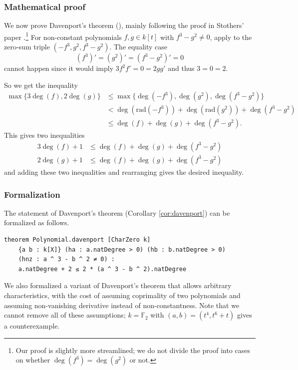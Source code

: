 \documentclass[runningheads]{llncs}
\newcommand{\rad}{\mathrm{rad}}
\begin{document}
\subsubsection{Mathematical proof}

We now prove Davenport's theorem (), mainly following the proof in Stothers' paper \cite{stothers81}.\footnote{Our proof is slightly more streamlined; we do not divide the proof into cases on whether $\deg(f^3) = \deg(g^2)$ or not.} For non-constant polynomials $f, g \in k[t]$ with $f^3 - g^2 \ne 0$, apply  to the zero-sum triple $(-f^3, g^2, f^3 - g^2)$.
The equality case
$$(f^3)' = (g^2)' = (f^3 - g^2)' = 0$$ cannot happen since it would imply $3f^2f' = 0 = 2gg'$ and thus $3 = 0 = 2$.

So we get the inequality
\begin{align*}
    \max \{3 \deg (f), 2 \deg (g) \} & \leq \max \{ \deg(-f^3), \deg(g^2), \deg(f^3 - g^2) \} \\
    &< \deg(\rad(-f^3)) +  \deg(\rad(g^2)) + \deg(f^3 - g^2) \\
    &\le \deg (f) + \deg(g) + \deg(f^3 - g^2).
\end{align*}
This gives two inequalities
\begin{align*}
    3 \deg(f) + 1 & \leq \deg(f) + \deg(g) + \deg(f^3 - g^2) \\
    2 \deg(g) + 1 & \leq \deg(f) + \deg(g) + \deg(f^3 - g^2)
\end{align*}
and adding these two inequalities and rearranging gives the desired inequality.


\subsubsection{Formalization}

The statement of Davenport's theorem (Corollary \ref{cor:davenport}) can be formalized as follows.
\begin{verbatim}
theorem Polynomial.davenport [CharZero k]
    {a b : k[X]} (ha : a.natDegree > 0) (hb : b.natDegree > 0)
    (hnz : a ^ 3 - b ^ 2 ≠ 0) :
    a.natDegree + 2 ≤ 2 * (a ^ 3 - b ^ 2).natDegree
\end{verbatim}

We also formalized a variant of Davenport's theorem that allows arbitrary characteristics, with the cost of assuming coprimality of two polynomials and assuming non-vanishing derivative instead of non-constantness.
Note that we cannot remove all of these assumptions; $k = \mathbb{F}_{2}$ with $(a, b) = (t^4, t^6 + t)$ gives a counterexample.
\end{document}
